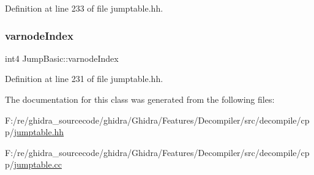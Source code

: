 Definition at line 233 of file jumptable.\+hh.

\mbox{\label{class_jump_basic_ae8f3090bdd209f55abad455b758438ac}} 
\subsubsection{\texorpdfstring{varnodeIndex}{varnodeIndex}}
{\footnotesize\ttfamily int4 Jump\+Basic\+::varnode\+Index\hspace{0.3cm}{\ttfamily [protected]}}



Definition at line 231 of file jumptable.\+hh.



The documentation for this class was generated from the following files\+:\begin{DoxyCompactItemize}
\item 
F\+:/re/ghidra\+\_\+sourcecode/ghidra/\+Ghidra/\+Features/\+Decompiler/src/decompile/cpp/\mbox{\hyperlink{jumptable_8hh}{jumptable.\+hh}}\item 
F\+:/re/ghidra\+\_\+sourcecode/ghidra/\+Ghidra/\+Features/\+Decompiler/src/decompile/cpp/\mbox{\hyperlink{jumptable_8cc}{jumptable.\+cc}}\end{DoxyCompactItemize}
